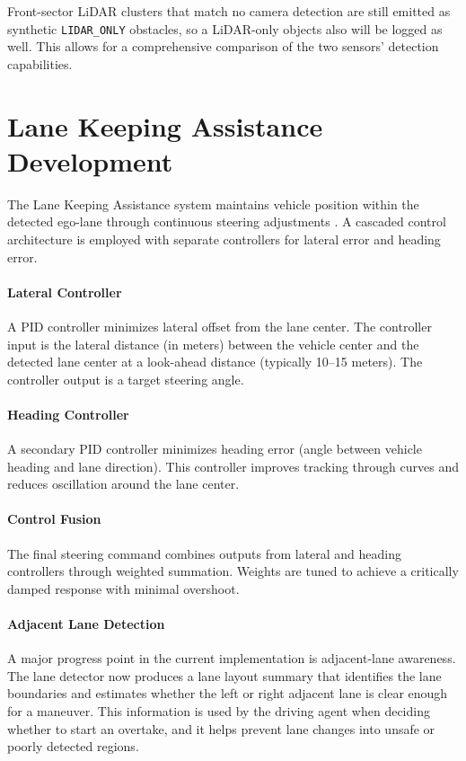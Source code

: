 \documentclass[12pt, a4paper]{report}
\begin{document}
Front-sector LiDAR clusters that match no camera detection are still emitted as
synthetic \texttt{LIDAR\_ONLY} obstacles, so a LiDAR-only objects also will be logged as well. 
This allows for a comprehensive comparison of the two sensors' detection capabilities.

\section{Lane Keeping Assistance Development}

The Lane Keeping Assistance system maintains vehicle position within the detected ego-lane through continuous steering adjustments \cite{ref33}. A cascaded control architecture is employed with separate controllers for lateral error and heading error.

\paragraph{Lateral Controller}

A PID controller minimizes lateral offset from the lane center. The controller input is the lateral distance (in meters) between the vehicle center and the detected lane center at a look-ahead distance (typically 10--15 meters). The controller output is a target steering angle.

\paragraph{Heading Controller}

A secondary PID controller minimizes heading error (angle between vehicle heading and lane direction). This controller improves tracking through curves and reduces oscillation around the lane center.

\paragraph{Control Fusion}

The final steering command combines outputs from lateral and heading controllers through weighted summation. Weights are tuned to achieve a critically damped response with minimal overshoot.

\paragraph{Adjacent Lane Detection}

A major progress point in the current implementation is adjacent-lane awareness. The lane detector now produces a lane layout summary that identifies the lane boundaries and estimates whether the left or right adjacent lane is clear enough for a maneuver. This information is used by the driving agent when deciding whether to start an overtake, and it helps prevent lane changes into unsafe or poorly detected regions.
\end{document}
